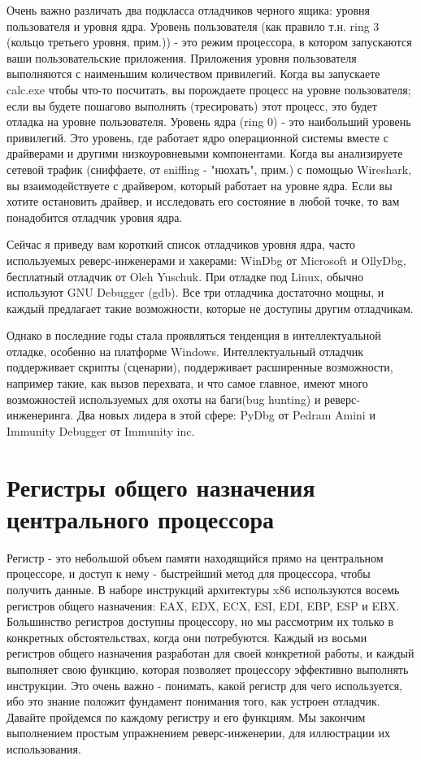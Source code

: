 \documentclass[12pt]{book}
\begin{document}
Очень важно различать два подкласса отладчиков черного ящика: уровня пользователя и уровня ядра. Уровень пользователя (как правило т.н. ring 3 (кольцо третьего уровня, прим.)) - это режим процессора, в котором запускаются ваши пользовательские приложения. Приложения уровня пользователя выполняются с наименьшим количеством привилегий. Когда вы запускаете calc.exe чтобы что-то посчитать, вы порождаете процесс на уровне пользователя; если вы будете пошагово выполнять (тресировать) этот процесс, это будет отладка на уровне пользователя. Уровень ядра (ring 0) - это наибольший уровень привилегий. Это уровень, где работает ядро операционной системы вместе с драйверами и другими низкоуровневыми компонентами. Когда вы анализируете сетевой трафик (сниффаете, от sniffing - "нюхать", прим.) с помощью Wireshark, вы взаимодействуете с драйвером, который работает на уровне ядра. Если вы хотите остановить драйвер, и исследовать его состояние в любой точке, то вам понадобится отладчик уровня ядра.

Сейчас я приведу вам короткий список отладчиков уровня ядра, часто используемых реверс-инженерами и хакерами: WinDbg от Microsoft и OllyDbg, бесплатный отладчик от Oleh Yuschuk. При отладке под Linux, обычно используют GNU Debugger (gdb). Все три отладчика достаточно мощны, и каждый предлагает такие возможности, которые не доступны другим отладчикам.

Однако в последние годы стала проявляться тенденция в интеллектуальной отладке, особенно на платформе Windows. Интеллектуальный отладчик поддерживает скрипты (сценарии), поддерживает расширенные возможности, например такие, как вызов перехвата, и что самое главное, имеют много возможностей используемых для охоты на баги(bug hunting) и реверс-инженеринга. Два новых лидера в этой сфере: PyDbg от Pedram Amini и Immunity Debugger от Immunity inc.


\section{Регистры общего назначения центрального процессора}

Регистр - это небольшой объем памяти находящийся прямо на центральном процессоре, и доступ к нему - быстрейший метод для процессора, чтобы получить данные. В наборе инструкций архитектуры x86 используются восемь регистров общего назначения: EAX, EDX, ECX, ESI, EDI, EBP, ESP и EBX. Большинство регистров доступны процессору, но мы рассмотрим их только в конкретных обстоятельствах, когда они потребуются. Каждый из восьми регистров общего назначения разработан для своей конкретной работы, и каждый выполняет свою функцию, которая позволяет процессору эффективно выполнять инструкции. Это очень важно - понимать, какой регистр для чего используется, ибо это знание положит фундамент понимания того, как устроен отладчик. Давайте пройдемся по каждому регистру и его функциям. Мы закончим выполнением простым упражнением реверс-инженерии, для иллюстрации их использования.
\end{document}
